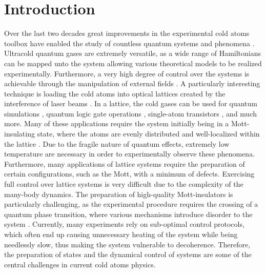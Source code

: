 \chapter{Introduction}
Over the last two decades great improvements in the experimental cold atoms toolbox have enabled the study of countless quantum systems and phenomena \cite{manybodyBloch,Bloch2012}. Ultracold quantum gases are extremely versatile, as a wide range of Hamiltonians can be mapped unto the system allowing various theoretical models to be realized experimentally. Furthermore, a very high degree of control over the systems is achievable through the manipulation of external fields \cite{JakschZoller}.
A particularly interesting technique is loading the cold atoms into optical lattices created by the interference of laser beams \cite{grimm}. In a lattice, the cold gases can be used for quantum simulations \cite{Jane2003,Jaksch2003}, quantum logic gate operations \cite{Zoller1999,Mandel2003,Jaksch2000}, single-atom transistors \cite{Micheli2004}, and much more. Many of these applications require the system initially being in a Mott-insulating state, where the atoms are evenly distributed and well-localized within the lattice \cite{lewenstein}.
Due to the fragile nature of quantum effects, extremely low temperature are necessary in order to experimentally observe these phenomena. Furthermore, many applications of lattice systems require the preparation of certain configurations, such as the Mott, with a minimum of defects. Exercising full control over lattice systems is very difficult due to the complexity of the many-body dynamics. The preparation of high-quality Mott-insulators is particularly challenging, as the experimental procedure requires the crossing of a quantum phase transition, where various mechanisms introduce disorder to the system \cite{Zurek2005,Braun2015}. Currently, many experiments rely on sub-optimal control protocols, which often end up causing unnecessary heating of the system while being needlessly slow, thus making the system vulnerable to decoherence.
Therefore, the preparation of states and the dynamical control of systems are some of the central challenges in current cold atoms physics.

